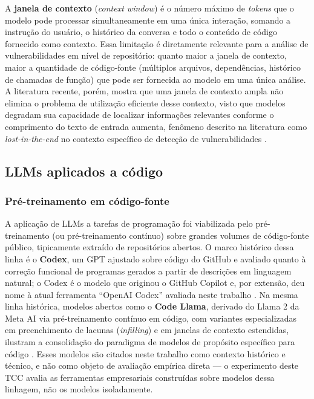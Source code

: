 A \textbf{janela de contexto} (\textit{context window}) é o número máximo de \textit{tokens} que o modelo pode processar simultaneamente em uma única interação, somando a instrução do usuário, o histórico da conversa e todo o conteúdo de código fornecido como contexto. Essa limitação é diretamente relevante para a análise de vulnerabilidades em nível de repositório: quanto maior a janela de contexto, maior a quantidade de código-fonte (múltiplos arquivos, dependências, histórico de chamadas de função) que pode ser fornecida ao modelo em uma única análise. A literatura recente, porém, mostra que uma janela de contexto ampla não elimina o problema de utilização eficiente desse contexto, visto que modelos degradam sua capacidade de localizar informações relevantes conforme o comprimento do texto de entrada aumenta, fenômeno descrito na literatura como \textit{lost-in-the-end} no contexto específico de detecção de vulnerabilidades \cite{Sovrano2025LostInEnd}.


\subsection{LLMs aplicados a código}\label{subsec:llms-codigo}
\subsubsection{Pré-treinamento em código-fonte}\label{subsubsec:pre-treinamento-codigo}
A aplicação de LLMs a tarefas de programação foi viabilizada pelo pré-treinamento (ou pré-treinamento contínuo) sobre grandes volumes de código-fonte público, tipicamente extraído de repositórios abertos. O marco histórico dessa linha é o \textbf{Codex}, um GPT ajustado sobre código do GitHub e avaliado quanto à correção funcional de programas gerados a partir de descrições em linguagem natural; o Codex é o modelo que originou o GitHub Copilot e, por extensão, deu nome à atual ferramenta ``OpenAI Codex'' avaliada neste trabalho \cite{Chen2021Codex}. Na mesma linha histórica, modelos abertos como o \textbf{Code Llama}, derivado do Llama 2 da Meta AI via pré-treinamento contínuo em código, com variantes especializadas em preenchimento de lacunas (\textit{infilling}) e em janelas de contexto estendidas, ilustram a consolidação do paradigma de modelos de propósito específico para código \cite{Roziere2023CodeLlama}. Esses modelos são citados neste trabalho como contexto histórico e técnico, e não como objeto de avaliação empírica direta — o experimento deste TCC avalia as ferramentas empresariais construídas sobre modelos dessa linhagem, não os modelos isoladamente.



